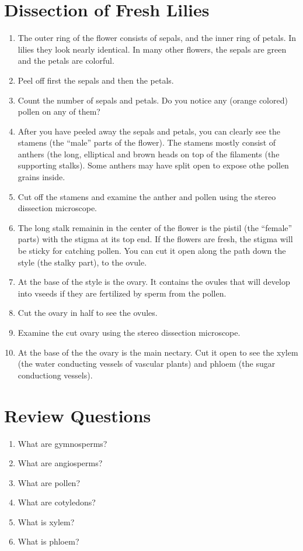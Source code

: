 \documentclass[]{book}
\providecommand{\tightlist}{%
  \setlength{\itemsep}{0pt}\setlength{\parskip}{0pt}}
\theoremstyle{definition}
\theoremstyle{definition}
\theoremstyle{definition}
\theoremstyle{remark}
\begin{document}
\section{Dissection of Fresh Lilies}\label{dissection-of-fresh-lilies}

\begin{enumerate}
\def\labelenumi{\arabic{enumi}.}
\tightlist
\item
  The outer ring of the flower consists of sepals, and the inner ring of
  petals. In lilies they look nearly identical. In many other flowers,
  the sepals are green and the petals are colorful.
\item
  Peel off first the sepals and then the petals.
\item
  Count the number of sepals and petals. Do you notice any (orange
  colored) pollen on any of them?
\item
  After you have peeled away the sepals and petals, you can clearly see
  the stamens (the ``male'' parts of the flower). The stamens mostly
  consist of anthers (the long, elliptical and brown heads on top of the
  filaments (the supporting stalks). Some anthers may have split open to
  expose othe pollen grains inside.
\item
  Cut off the stamens and examine the anther and pollen using the stereo
  dissection microscope.
\item
  The long stalk remainin in the center of the flower is the pistil (the
  ``female'' parts) with the stigma at its top end. If the flowers are
  fresh, the stigma will be sticky for catching pollen. You can cut it
  open along the path down the style (the stalky part), to the ovule.
\item
  At the base of the style is the ovary. It contains the ovules that
  will develop into vseeds if they are fertilized by sperm from the
  pollen.
\item
  Cut the ovary in half to see the ovules.
\item
  Examine the cut ovary using the stereo dissection microscope.
\item
  At the base of the the ovary is the main nectary. Cut it open to see
  the xylem (the water conducting vessels of vascular plants) and phloem
  (the sugar conductiong vessels).
\end{enumerate}

\section{Review Questions}\label{review-questions-2}

\begin{enumerate}
\def\labelenumi{\arabic{enumi}.}
\tightlist
\item
  What are gymnosperms?
\item
  What are angiosperms?
\item
  What are pollen?
\item
  What are cotyledons?
\item
  What is xylem?
\item
  What is phloem?
\end{enumerate}
\end{document}
